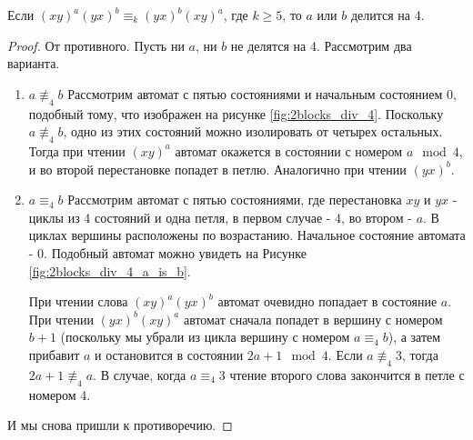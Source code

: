  \begin{lemma} \label{2blocks div 4}
 	Если $(xy)^a(yx)^b \equiv_k (yx)^b(xy)^a$, где $k \ge 5$, то $a$ или $b$ делится на 4.
 \end{lemma}
 \begin{proof}
 	От противного. Пусть ни $a$, ни $b$ не делятся на 4. Рассмотрим два варианта.
 	\begin{enumerate}
 		\item $a \not \equiv_4 b$
 		Рассмотрим автомат с пятью состояниями и начальным состоянием 0, подобный тому, что изображен на рисунке \ref{fig:2blocks_div_4}. Поскольку $a \not \equiv_4 b$, одно из этих  состояний можно изолировать от четырех остальных. Тогда при чтении $(xy)^a$ автомат окажется в состоянии с номером $a \mod 4$, и во второй перестановке попадет в петлю. Аналогично при чтении $(yx)^b$.
 		
 		\item $a \equiv_4 b$
 		Рассмотрим автомат с пятью состояниями, где перестановка $xy$ и $yx$ - циклы из 4 состояний и одна петля, в первом случае - 4, во втором - $a$. В циклах вершины расположены по возрастанию. Начальное состояние автомата - 0. Подобный автомат можно увидеть на Рисунке \ref{fig:2blocks_div_4_a_is_b}.
 		
 		При чтении слова  $(xy)^a(yx)^b$ автомат очевидно попадает в состояние $a$. При чтении $(yx)^b(xy)^a$ автомат сначала попадет в вершину с номером $b+1$ (поскольку мы убрали из цикла вершину с номером $a \equiv_4 b$), а затем прибавит $a$ и остановится в состоянии $2a+1 \mod 4$. Если $a \not \equiv_4 3$, тогда $2a+1 \not \equiv_4 a$. В случае, когда $a \equiv_4 3$ чтение второго слова закончится в петле с номером 4. 
 	\end{enumerate}
 	И мы снова пришли к противоречию.
 \end{proof}

